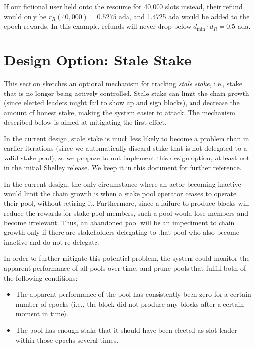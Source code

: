 \documentclass[11pt,a4paper,dvipsnames,twosided]{article}
\begin{document}
If our fictional user held onto the resource for 40,000 slots instead,
their refund would only be $r_R(40,000)=0.5275$ ada, and 1.4725 ada
would be added to the epoch rewards. In this example, refunds will
never drop below $d_{\min}\cdot d_R=0.5$ ada.

\section{Design Option: Stale Stake}
\label{stale-stake}

This section sketches an optional mechanism for tracking \emph{stale
  stake}, i.e., stake that is no longer being actively
controlled. Stale stake can limit the chain growth (since elected
leaders might fail to show up and sign blocks), and decrease the
amount of honest stake, making the system easier to attack. The
mechanism described below is aimed at mitigating the first effect.

In the current design, stale stake is much less likely to become a
problem than in earlier iterations (since we automatically discard
stake that is not delegated to a valid stake pool), so we propose to
not implement this design option, at least not in the initial Shelley
release. We keep it in this document for further reference.

In the current design, the only circumstance where an actor becoming inactive
would limit the chain growth is when a stake pool operator ceases to operate
their pool, without retiring it. Furthermore, since a failure to produce blocks
will reduce the rewards for stake pool members, such a pool would lose members
and become irrelevant. Thus, an abandoned pool will be an impediment to chain
growth only if there are stakeholders delegating to that pool who also become
inactive and do not re-delegate.

In order to further mitigate this potential problem, the system could monitor
the apparent performance of all pools over time, and prune pools that fulfill
both of the following conditions:

\begin{itemize}
  \item The apparent performance of the pool has consistently been zero for a
    certain number of epochs (i.e., the block did not produce any blocks after a
    certain moment in time).
  \item The pool has enough stake that it should have been elected as slot
    leader within those epochs several times.
\end{itemize}
\end{document}

